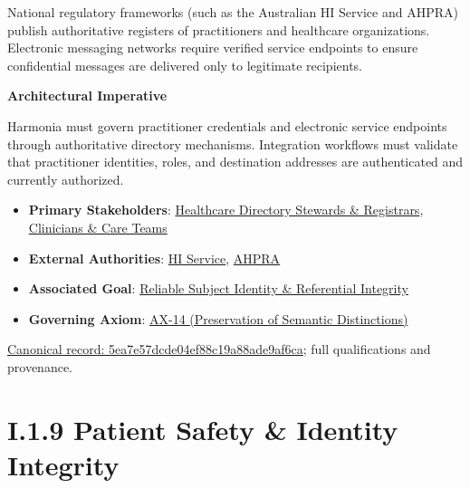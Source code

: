 National regulatory frameworks (such as the Australian HI Service and AHPRA) publish authoritative registers of practitioners and healthcare organizations. Electronic messaging networks require verified service endpoints to ensure confidential messages are delivered only to legitimate recipients.



\par\medskip\textbf{Architectural Imperative}\par


Harmonia must govern practitioner credentials and electronic service endpoints through authoritative directory mechanisms. Integration workflows must validate that practitioner identities, roles, and destination addresses are authenticated and currently authorized.



\begin{itemize}


\item \textbf{Primary Stakeholders}: \href{\detokenize{../../../../../../../../docs/markdown/01-motivation/stakeholders/enterprise-stakeholders.md}}{Healthcare Directory Stewards \& Registrars}, \href{\detokenize{../../../../../../../../docs/markdown/01-motivation/stakeholders/enterprise-stakeholders.md}}{Clinicians \& Care Teams}

\item \textbf{External Authorities}: \href{\detokenize{../../../../../../../../docs/markdown/01-motivation/stakeholders/external-authorities.md}}{HI Service}, \href{\detokenize{../../../../../../../../docs/markdown/01-motivation/stakeholders/external-authorities.md}}{AHPRA}

\item \textbf{Associated Goal}: \href{\detokenize{../../../../../../../../docs/markdown/01-motivation/goals-outcomes/strategic-goals.md}}{Reliable Subject Identity \& Referential Integrity}

\item \textbf{Governing Axiom}: \hyperref[element:d3fc6025dc7646d1b2020b51f7a44bfa]{AX-14 (Preservation of Semantic Distinctions)}

\end{itemize}

{\footnotesize \href{../../../../../../../continuum/motivation/driver/5ea7e57dcde04ef88c19a88ade9af6ca.md}{Canonical record: 5ea7e57dcde04ef88c19a88ade9af6ca}; full qualifications and provenance.}\par
\section*{I.1.9 Patient Safety \& Identity Integrity}
\label{navigation:I.1.9}

